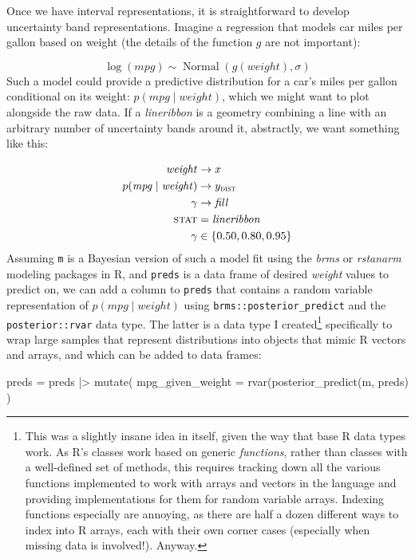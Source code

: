 \documentclass[journal]{vgtc}                     %
\newenvironment{centerverbatim}{%
  \hfill\break
  \small
  \centering
  \varwidth{\linewidth}%
  \verbatim
}{%
  \endverbatim
  \endvarwidth
  \par
  \hfill\break
}
\begin{document}
Once we have interval representations, it is straightforward to develop uncertainty band representations. Imagine a regression that models car miles per gallon based on weight (the details of the function $g$ are not important):

\[
\log(\mathit{mpg}) \sim \operatorname{Normal}\left(g(\mathit{weight}), \sigma\right)
\]
Such a model could provide a predictive distribution for a car's miles per gallon conditional on its weight: $p(\mathit{mpg} \mid \mathit{weight})$, which we might want to plot alongside the raw data. If a \textit{lineribbon} is a geometry combining a line with an arbitrary number of uncertainty bands around it, abstractly, we want something like this:

\begin{align*}
\mathit{weight} &\rightarrow x\\
p(\mathit{mpg} \mid \mathit{weight}) &\rightarrow y_\textsc{dist}\\
\gamma &\rightarrow \mathit{fill}\\
\textsc{stat} &= \mathit{lineribbon}\\
\gamma &\in \{0.50, 0.80, 0.95\}
\end{align*}
Assuming \texttt{m}  is a Bayesian version of such a model fit using the \textit{brms} or \textit{rstanarm} modeling packages in R, and \texttt{preds} is a data frame of desired \textit{weight} values to predict on, we can add a column to \texttt{preds} that contains a random variable representation of $p(\mathit{mpg} \mid \mathit{weight})$ using \texttt{brms::posterior\_predict} and the \texttt{posterior::rvar}  data type. The latter is a data type I created\footnote{This was a slightly insane idea in itself, given the way that base R data types work. As R's classes work based on generic \textit{functions}, rather than classes with a well-defined set of methods, this requires tracking down all the various functions implemented to work with arrays and vectors in the language and providing implementations for them for random variable arrays. Indexing functions especially are annoying, as there are half a dozen different ways to index into R arrays, each with their own corner cases (especially when missing data is involved!). Anyway.} specifically to wrap large samples that represent distributions into objects that mimic R vectors and arrays, and which can be added to data frames:

\begin{centerverbatim}
preds = preds |> mutate(
  mpg_given_weight = rvar(posterior_predict(m, preds)
)
\end{centerverbatim}
\end{document}
